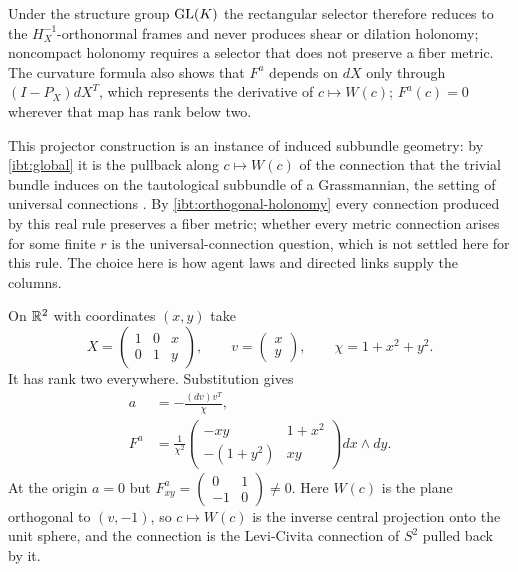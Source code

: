 Under the structure group $\mathrm{GL}(K)$ the rectangular selector therefore reduces to the $H_X^{-1}$-orthonormal frames and never produces shear or dilation holonomy; noncompact holonomy requires a selector that does not preserve a fiber metric. The curvature formula also shows that $F^a$ depends on $dX$ only through $(I-P_X)dX^T$, which represents the derivative of $c\mapsto W(c)$; $F^a(c)=0$ wherever that map has rank below two.

This projector construction is an instance of induced subbundle geometry: by \cref{ibt:global} it is the pullback along $c\mapsto W(c)$ of the connection that the trivial bundle induces on the tautological subbundle of a Grassmannian, the setting of universal connections \citep{NarasimhanRamanan1961,NarasimhanRamanan1963,MassambaThompson2003}. By \cref{ibt:orthogonal-holonomy} every connection produced by this real rule preserves a fiber metric; whether every metric connection arises for some finite $r$ is the universal-connection question, which is not settled here for this rule. The choice here is how agent laws and directed links supply the columns.

On $\mathbb R^2$ with coordinates $(x,y)$ take
\begin{equation}
 X=\begin{pmatrix}1&0&x\\0&1&y\end{pmatrix},\qquad
 v=\begin{pmatrix}x\\y\end{pmatrix},\qquad \chi=1+x^2+y^2.
 \label{ibt:eq:witnessX}
\end{equation}
It has rank two everywhere. Substitution gives
\begin{align}
 a&=-\frac{(d v)v^T}{\chi},\label{ibt:eq:witnessA}\\
 F^a&=\frac{1}{\chi^2}
 \begin{pmatrix}-xy&1+x^2\\-(1+y^2)&xy\end{pmatrix}
 d x\wedge d y.
 \label{ibt:eq:witnessF}
\end{align}
At the origin $a=0$ but $F^a_{xy}=\begin{pmatrix}0&1\\-1&0\end{pmatrix}\ne0$. Here $W(c)$ is the plane orthogonal to $(v,-1)$, so $c\mapsto W(c)$ is the inverse central projection onto the unit sphere, and the connection is the Levi-Civita connection of $S^2$ pulled back by it.

